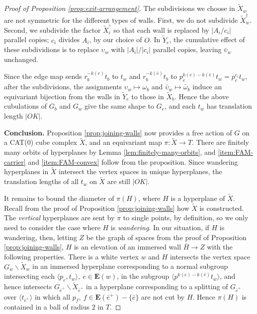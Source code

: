 \documentclass[11pt,oneside]{amsart}
\theoremstyle{definition}
\begin{document}
\begin{proof}[Proof of Proposition \ref{prop:exit-arrangement}]
The subdivisions we choose in $\widetilde X_w$ are not symmetric for the different types of walls.  First, we do not subdivide $\widetilde X^\dagger_w$.  Second, we subdivide the factor $\widetilde X^\circ_i$ so that each wall is replaced by $|A_i/c_i|$ parallel copies; $c_i$ divides $A_i$, by our choice of $O$.  In $\widetilde Y_e$, the cumulative effect of these subdividions is to replace $\upsilon_w$ with $|A_i|/|c_i|$ parallel copies, leaving $\bar\upsilon_w$ unchanged.

Since the edge map sends $r_b^{-k(e)}t_b$ to $t_{w}$ and $r_b^{-k(\bar e)}t_b$ to $p_{e}^{k(e)-k(\bar e)}t_{w}=p_e^{c_i}t_w$, after the subdivisions, the assignments $\upsilon_w\mapsto \omega_b$ and $\bar\upsilon_w\mapsto \bar\omega_b$ induce an equivariant bijection from the walls in $\widetilde Y_e$ to those in $\widetilde X_b$.  Hence the above cubulations of $G_b$ and $G_w$ give the same shape to $G_e$, and each $t_w$ has translation length $|OK|$.

\textbf{Conclusion.}  Proposition \ref{prop:joining-walls} now provides a free action of $G$ on a CAT(0) cube complex $\widetilde X$, and an equivariant map $\pi:\widetilde X\to T$.  There are finitely many orbits of hyperplanes by Lemma \ref{lem:finitely-many-orbits}, and \eqref{item:FAM-carrier} and \eqref{item:FAM-convex} follow from the proposition.  Since wandering hyperplanes in $\widetilde X$ intersect the vertex spaces in unique hyperplanes, the translation lengths of all $t_w$ on $\widetilde X$ are still $|OK|$.

It remains to bound the diameter of $\pi(H)$, where $H$ is a hyperplane of $\widetilde X$. Recall from the proof of Proposition \ref{prop:joining-walls} how $\widetilde X$ is constructed.  The \emph{vertical} hyperplanes are sent by $\pi$ to single points, by definition, so we only need to consider the case where $H$ is \emph{wandering}.  In our situation, if $H$ is wandering, then, letting $Z$ be the graph of spaces from the proof of Proposition \ref{prop:joining-walls}, $H$ is an elevation of an immersed wall $\bar H\to Z$ with the following properties.  There is a white vertex $w$ and $H$ intersects the vertex space $G_w\backslash\widetilde X_w$ in an immersed hyperplane corresponding to a normal subgroup intersecting each $\langle p_e,t_w\rangle,\ e\in\mathbf E(w)$, in the subgroup $\langle p^{k(e)-k(\bar e)}t_w\rangle$, and hence intersects $G_{\bar e^+}\backslash \widetilde X_{\bar e^+}$ in a hyperplane corresponding to a splitting of $G_{\bar e^+}$ over $\langle t_{\bar e^+}\rangle$ in which all $p_f,\ f\in\mathbf E(\bar e^+)-\{\bar e\}$ are not cut by $H$.  Hence $\pi(H)$ is contained in a ball of radius $2$ in $T$.
\renewcommand{\qedsymbol}{$\Box$}
\end{proof}
\end{document}
